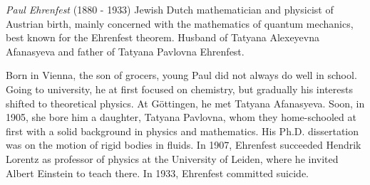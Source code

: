 \documentclass[12pt]{article}
\begin{document}
\emph{Paul Ehrenfest} (1880 - 1933) Jewish Dutch mathematician and physicist of Austrian birth, mainly concerned with the mathematics of quantum mechanics, best known for the Ehrenfest theorem. Husband of Tatyana Alexeyevna Afanasyeva and father of Tatyana Pavlovna Ehrenfest.

Born in Vienna, the son of grocers, young Paul did not always do well in school. Going to university, he at first focused on chemistry, but gradually his interests shifted to theoretical physics. At G\"ottingen, he met Tatyana Afanasyeva. Soon, in 1905, she bore him a daughter, Tatyana Pavlovna, whom they home-schooled at first with a solid background in physics and mathematics. His Ph.D. dissertation was on the motion of rigid bodies in fluids. In 1907, Ehrenfest succeeded Hendrik Lorentz as professor of physics at the University of Leiden, where he invited Albert Einstein to teach there. In 1933, Ehrenfest committed suicide.
\end{document}
